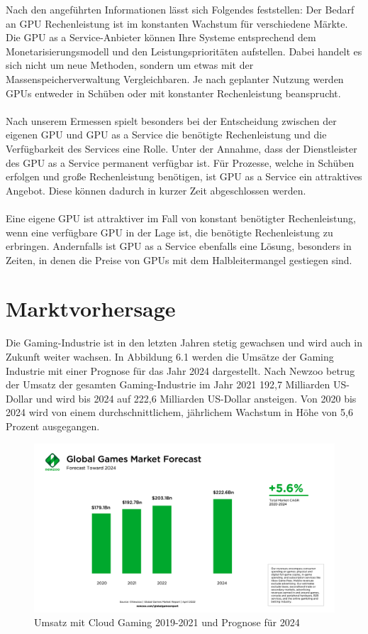 \documentclass[12pt,toc=bib,toc=listof]{scrreprt}
\begin{document}
Nach den angeführten Informationen lässt sich Folgendes feststellen:  
Der Bedarf an GPU Rechenleistung ist im konstanten Wachstum für verschiedene Märkte. Die GPU as a Service-Anbieter 
können Ihre Systeme entsprechend dem Monetarisierungsmodell und den Leistungsprioritäten aufstellen. 
Dabei handelt es sich nicht um neue Methoden, sondern um etwas mit der Massenspeicherverwaltung Vergleichbaren. 
Je nach geplanter Nutzung werden GPUs entweder in Schüben oder mit konstanter Rechenleistung beansprucht.\\ \\
Nach unserem Ermessen spielt besonders bei der Entscheidung zwischen der eigenen GPU und GPU as a Service die 
benötigte Rechenleistung und die Verfügbarkeit des Services eine Rolle. Unter der Annahme, dass der Dienstleister des GPU as a Service permanent 
verfügbar ist. Für Prozesse, welche in Schüben erfolgen und große Rechenleistung benötigen, ist GPU as a Service ein attraktives Angebot.
Diese können dadurch in kurzer Zeit abgeschlossen werden.\\ \\
Eine eigene GPU ist attraktiver im Fall von konstant benötigter Rechenleistung, wenn eine verfügbare GPU in der Lage ist, 
die benötigte Rechenleistung zu erbringen. Andernfalls ist GPU as a Service ebenfalls eine Lösung, besonders in Zeiten,
in denen die Preise von GPUs mit dem Halbleitermangel gestiegen sind.

\chapter{Marktvorhersage}
\label{sec:Marktvorhersage}

Die Gaming-Industrie ist in den letzten Jahren stetig gewachsen und wird auch in Zukunft weiter
wachsen. In Abbildung 6.1 werden die Umsätze der Gaming Industrie mit einer Prognose für das Jahr 2024 dargestellt.
Nach Newzoo betrug der Umsatz der gesamten Gaming-Industrie im Jahr 2021 192,7 Milliarden
US-Dollar und wird bis 2024 auf 222,6 Milliarden US-Dollar ansteigen. Von 2020 bis 2024 wird 
von einem durchschnittlichem, jährlichem Wachstum in Höhe von 5,6 Prozent ausgegangen.
\\%
\begin{figure}[h]
 \centering
  \includegraphics[scale=0.12]{Abbildungen/Newzoo_Global_Games_Revenue_Forecast-2.png} 
  \caption[Newzoo]{Umsatz mit Cloud Gaming 2019-2021 und Prognose für 2024}
\end{figure}
\\%
\end{document}
